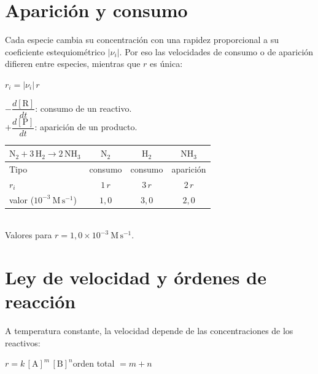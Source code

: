\documentclass[10pt,letterpaper]{article}
\newcommand{\A}{[\mathrm{A}]}
\newcommand{\B}{[\mathrm{B}]}
\begin{document}
\section{Aparición y consumo}
Cada especie cambia su concentración con una rapidez proporcional a su coeficiente estequiométrico $|\nu_i|$. Por eso las
velocidades de consumo o de aparición difieren entre especies, mientras que $r$ es única:

\vspace{2pt}
\begin{minipage}[t]{0.38\linewidth}\vspace{0pt}
\begin{clave}
$\displaystyle r_i=|\nu_i|\,r$
\end{clave}
\small $-\dfrac{d[\mathrm{R}]}{dt}$: consumo de un reactivo.\\[5pt]
$+\dfrac{d[\mathrm{P}]}{dt}$: aparición de un producto.
\end{minipage}\hfill
\begin{minipage}[t]{0.58\linewidth}\vspace{0pt}
\small\setlength{\tabcolsep}{6pt}
\begin{tabular}{@{}lccc@{}}
\toprule
$\mathrm{N_2}+3\,\mathrm{H_2}\to2\,\mathrm{NH_3}$ & $\mathrm{N_2}$ & $\mathrm{H_2}$ & $\mathrm{NH_3}$\\
\midrule
Tipo & consumo & consumo & aparición\\
$r_i$ & $1\,r$ & $3\,r$ & $2\,r$\\
valor ($10^{-3}\ \mathrm{M\,s^{-1}}$) & $1{,}0$ & $3{,}0$ & $2{,}0$\\
\bottomrule
\end{tabular}\\[3pt]
{\footnotesize Valores para $r=1{,}0\times10^{-3}\ \mathrm{M\,s^{-1}}$.}
\end{minipage}

\clearpage
\section{Ley de velocidad y órdenes de reacción}
A temperatura constante, la velocidad depende de las concentraciones de los reactivos:
\begin{clave}
$\displaystyle r=k\,\A^{m}\,\B^{n}$\hfill\small orden total $=m+n$
\end{clave}
\end{document}
